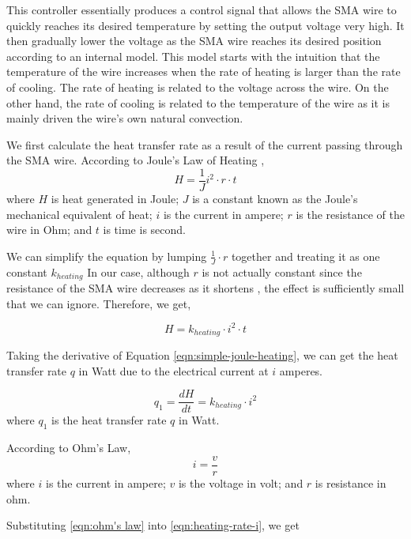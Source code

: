 This controller essentially produces a control signal that allows the SMA wire to quickly reaches its desired temperature by setting the output voltage very high. It then gradually lower the voltage as the SMA wire reaches its desired position according to an internal model. This model starts with the intuition that the temperature of the wire increases when the rate of heating is larger than the rate of cooling. The rate of heating is related to the voltage across the wire. On the other hand, the rate of cooling is related to the temperature of the wire as it is mainly driven the wire's own natural convection. 

We first calculate the heat transfer rate as a result of the current passing through the SMA wire. According to Joule's Law of Heating \cite{JouleHeating},
\begin{equation}
	H = \frac{1}{J}i^2 \cdot r \cdot t
\end{equation}
where $H$ is heat generated in Joule; $J$ is a constant known as the Joule's mechanical equivalent of heat; $i$ is the current in ampere; $r$ is the resistance of the wire in Ohm; and $t$ is time is second.

We can simplify the equation by lumping $\frac{1}{J}\cdot r$ together and treating it as one constant $k_{heating}$
In our case, although $r$ is not actually constant since the resistance of the SMA wire decreases as it shortens \cite{FlexinolTechSpecs}, the effect is sufficiently small that we can ignore. Therefore, we get,

\begin{equation}\label{eqn:simple-joule-heating}
H = k_{heating} \cdot i^2 \cdot t
\end{equation}

Taking the derivative of Equation \eqref{eqn:simple-joule-heating}, we can get the heat transfer rate $q$ in Watt due to the electrical current at $i$ amperes. 

\begin{equation}\label{eqn:heating-rate-i}
	q_1 = \frac{dH}{dt} = k_{heating} \cdot i^2
\end{equation}
where $q_1$ is the heat transfer rate $q$ in Watt.

According to Ohm's Law, 
\begin{equation}\label{eqn:ohm's law}
	i = \frac{v}{r}
\end{equation}
where $i$ is the current in ampere; $v$ is the voltage in volt; and $r$ is resistance in ohm.

Substituting \eqref{eqn:ohm's law} into \eqref{eqn:heating-rate-i}, we get

